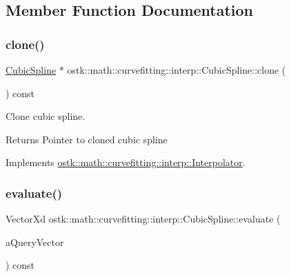 \subsection{Member Function Documentation}
\mbox{\label{classostk_1_1math_1_1curvefitting_1_1interp_1_1_cubic_spline_a43d9d4ff7c386a5f3442dc8a617aa0cc}} 
\subsubsection{\texorpdfstring{clone()}{clone()}}
{\footnotesize\ttfamily \hyperlink{classostk_1_1math_1_1curvefitting_1_1interp_1_1_cubic_spline}{Cubic\+Spline} $\ast$ ostk\+::math\+::curvefitting\+::interp\+::\+Cubic\+Spline\+::clone (\begin{DoxyParamCaption}{ }\end{DoxyParamCaption}) const\hspace{0.3cm}{\ttfamily [virtual]}}



Clone cubic spline. 

\begin{DoxyReturn}{Returns}
Pointer to cloned cubic spline 
\end{DoxyReturn}


Implements \hyperlink{classostk_1_1math_1_1curvefitting_1_1interp_1_1_interpolator_a717dc5547d117cccd73506b75c40c66a}{ostk\+::math\+::curvefitting\+::interp\+::\+Interpolator}.

\mbox{\label{classostk_1_1math_1_1curvefitting_1_1interp_1_1_cubic_spline_a69c23827173fe8ee587d468551246fd9}} 
\subsubsection{\texorpdfstring{evaluate()}{evaluate()}\hspace{0.1cm}{\footnotesize\ttfamily [1/2]}}
{\footnotesize\ttfamily Vector\+Xd ostk\+::math\+::curvefitting\+::interp\+::\+Cubic\+Spline\+::evaluate (\begin{DoxyParamCaption}\item[{const Vector\+Xd \&}]{a\+Query\+Vector }\end{DoxyParamCaption}) const\hspace{0.3cm}{\ttfamily [virtual]}}



